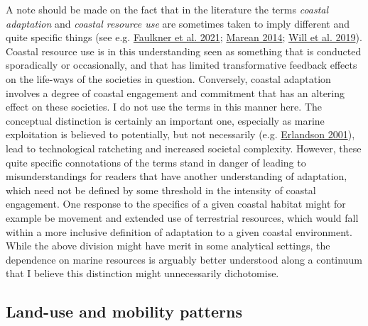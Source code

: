 \documentclass[
  12pt,
  a4paper,
  oneside]{book}
\begin{document}
A note should be made on the fact that in the literature the terms \emph{coastal adaptation} and \emph{coastal resource use} are sometimes taken to imply different and quite specific things (see e.g. \protect\hyperlink{ref-faulkner2021}{Faulkner et al. 2021}; \protect\hyperlink{ref-marean2014}{Marean 2014}; \protect\hyperlink{ref-will2019}{Will et al. 2019}). Coastal resource use is in this understanding seen as something that is conducted sporadically or occasionally, and that has limited transformative feedback effects on the life-ways of the societies in question. Conversely, coastal adaptation involves a degree of coastal engagement and commitment that has an altering effect on these societies. I do not use the terms in this manner here. The conceptual distinction is certainly an important one, especially as marine exploitation is believed to potentially, but not necessarily (e.g. \protect\hyperlink{ref-erlandson2001}{Erlandson 2001}), lead to technological ratcheting and increased societal complexity. However, these quite specific connotations of the terms stand in danger of leading to misunderstandings for readers that have another understanding of adaptation, which need not be defined by some threshold in the intensity of coastal engagement. One response to the specifics of a given coastal habitat might for example be movement and extended use of terrestrial resources, which would fall within a more inclusive definition of adaptation to a given coastal environment. While the above division might have merit in some analytical settings, the dependence on marine resources is arguably better understood along a continuum that I believe this distinction might unnecessarily dichotomise.

\hypertarget{land-use-and-mobility-patterns}{%
\subsection{Land-use and mobility patterns}\label{land-use-and-mobility-patterns}}
\end{document}
